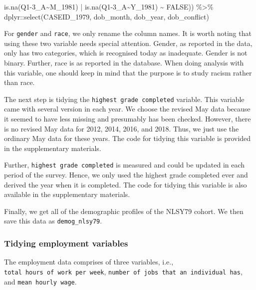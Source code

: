 \documentclass[12pt]{article}
\newenvironment{Shaded}{\begin{snugshade}}{\end{snugshade}}
\newcommand{\AttributeTok}[1]{\textcolor[rgb]{0.77,0.63,0.00}{#1}}
\newcommand{\ConstantTok}[1]{\textcolor[rgb]{0.00,0.00,0.00}{#1}}
\newcommand{\FunctionTok}[1]{\textcolor[rgb]{0.00,0.00,0.00}{#1}}
\newcommand{\NormalTok}[1]{#1}
\newcommand{\SpecialCharTok}[1]{\textcolor[rgb]{0.00,0.00,0.00}{#1}}
\newcommand{\StringTok}[1]{\textcolor[rgb]{0.31,0.60,0.02}{#1}}
\begin{document}
\begin{Shaded}
\begin{Highlighting}[]
      \FunctionTok{is.na}\NormalTok{(}\StringTok{\textasciigrave{}}\AttributeTok{Q1{-}3\_A\textasciitilde{}M\_1981}\StringTok{\textasciigrave{}}\NormalTok{) }\SpecialCharTok{|} \FunctionTok{is.na}\NormalTok{(}\StringTok{\textasciigrave{}}\AttributeTok{Q1{-}3\_A\textasciitilde{}Y\_1981}\StringTok{\textasciigrave{}}\NormalTok{) }\SpecialCharTok{\textasciitilde{}} \ConstantTok{FALSE}\NormalTok{)) }\SpecialCharTok{\%\textgreater{}\%}
\NormalTok{  dplyr}\SpecialCharTok{::}\FunctionTok{select}\NormalTok{(CASEID\_1979,}
\NormalTok{                dob\_month,}
\NormalTok{                dob\_year,}
\NormalTok{                dob\_conflict)}
\end{Highlighting}
\end{Shaded}

For \texttt{gender} and \texttt{race}, we only rename the column names. It is worth noting that using these two variable needs special attention. Gender, as reported in the data, only has two categories, which is recognised today as inadequate. Gender is not binary. Further, race is as reported in the database. When doing analysis with this variable, one should keep in mind that the purpose is to study racism rather than race.

The next step is tidying the \texttt{highest\ grade\ completed} variable. This variable came with several version in each year. We choose the revised May data because it seemed to have less missing and presumably has been checked. However, there is no revised May data for 2012, 2014, 2016, and 2018. Thus, we just use the ordinary May data for these years. The code for tidying this variable is provided in the supplementary materials.

Further, \texttt{highest\ grade\ completed} is measured and could be updated in each period of the survey. Hence, we only used the highest grade completed ever and derived the year when it is completed. The code for tidying this variable is also available in the supplementary materials.

Finally, we get all of the demographic profiles of the NLSY79 cohort. We then save this data as \texttt{demog\_nlsy79}.

\hypertarget{tidying-employment-variables}{%
\subsubsection{Tidying employment variables}\label{tidying-employment-variables}}

The employment data comprises of three variables, i.e., \texttt{total\ hours\ of\ work\ per\ week}, \texttt{number\ of\ jobs\ that\ an\ individual\ has}, and \texttt{mean\ hourly\ wage}.
\end{document}
